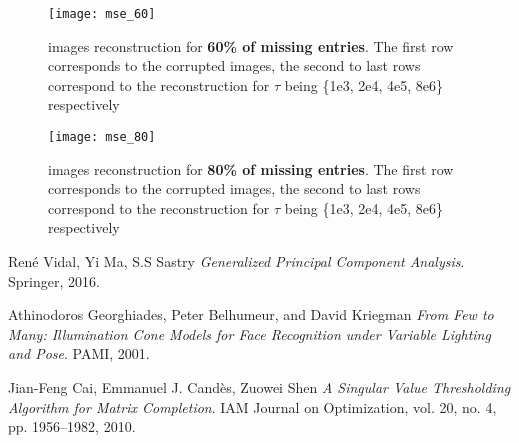 \documentclass[a4paper, 11pt]{article}
\begin{document}
\begin{figure}[p]
  \centering
  \texttt{[image: mse\_60]}
  \caption{images reconstruction for \textbf{60\% of missing
      entries}. The first row corresponds to the corrupted images, the
    second to last rows correspond to the reconstruction for $\tau$
    being \{1e3, 2e4, 4e5, 8e6\} respectively}
  \label{fig:mse60}
\end{figure}

\begin{figure}[p]
  \centering
  \texttt{[image: mse\_80]}
  \caption{images reconstruction for \textbf{80\% of missing
      entries}. The first row corresponds to the corrupted images, the
    second to last rows correspond to the reconstruction for $\tau$
    being \{1e3, 2e4, 4e5, 8e6\} respectively}
  \label{fig:mse80}
\end{figure}

\clearpage
\begin{thebibliography}{9}
René Vidal, Yi Ma, S.S Sastry
\textit{Generalized Principal Component Analysis}.
Springer, 2016.

Athinodoros Georghiades, Peter Belhumeur, and David Kriegman
\textit{From Few to Many: Illumination Cone Models for Face Recognition under
Variable Lighting and Pose}.
PAMI, 2001.

Jian-Feng Cai, Emmanuel J. Candès, Zuowei Shen
\textit{A Singular Value Thresholding Algorithm for Matrix Completion}.
IAM Journal on Optimization, vol. 20, no. 4, pp. 1956–1982, 2010.
\end{thebibliography}
\end{document}
